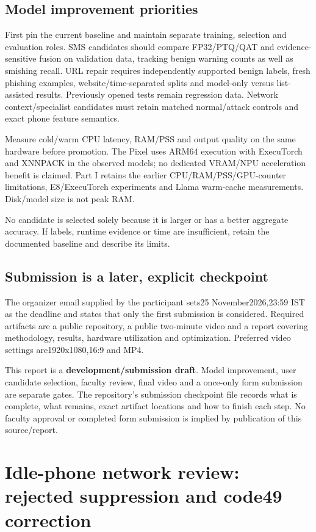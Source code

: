 \section{Model improvement priorities}
First pin the current baseline and maintain separate training, selection and evaluation roles. SMS candidates should compare FP32/PTQ/QAT and evidence-sensitive fusion on validation data, tracking benign warning counts as well as smishing recall. URL repair requires independently supported benign labels, fresh phishing examples, website/time-separated splits and model-only versus list-assisted results. Previously opened tests remain regression data. Network context/specialist candidates must retain matched normal/attack controls and exact phone feature semantics.

Measure cold/warm CPU latency, RAM/PSS and output quality on the same hardware before promotion. The Pixel uses ARM64 execution with ExecuTorch and XNNPACK in the observed models; no dedicated VRAM/NPU acceleration benefit is claimed. Part I retains the earlier CPU/RAM/PSS/GPU-counter limitations, E8/ExecuTorch experiments and Llama warm-cache measurements. Disk/model size is not peak RAM.

No candidate is selected solely because it is larger or has a better aggregate accuracy. If labels, runtime evidence or time are insufficient, retain the documented baseline and describe its limits.

\section{Submission is a later, explicit checkpoint}
The organizer email supplied by the participant sets25 November2026,23:59 IST as the deadline and states that only the first submission is considered. Required artifacts are a public repository, a public two-minute video and a report covering methodology, results, hardware utilization and optimization. Preferred video settings are1920x1080,16:9 and MP4.

This report is a \textbf{development/submission draft}. Model improvement, user candidate selection, faculty review, final video and a once-only form submission are separate gates. The repository's submission checkpoint file records what is complete, what remains, exact artifact locations and how to finish each step. No faculty approval or completed form submission is implied by publication of this source/report.

\chapter{Idle-phone network review: rejected suppression and code49 correction}
